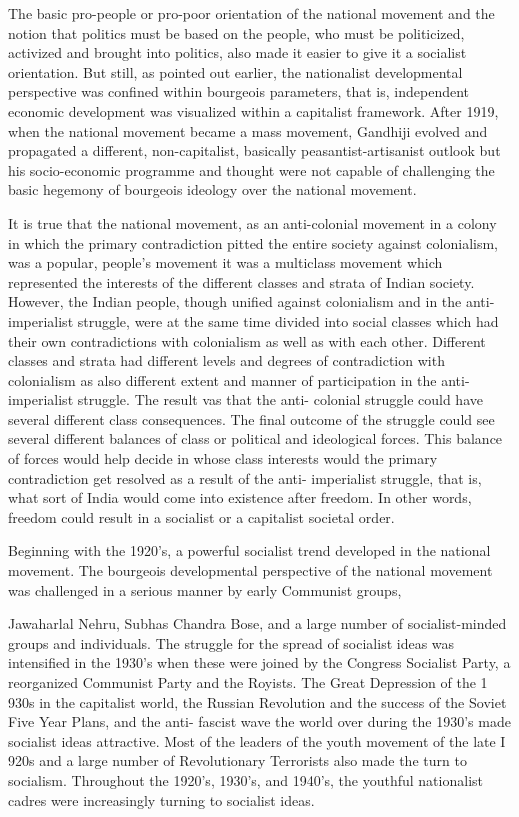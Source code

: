 \begin{multicols}{2}
The basic pro-people or pro-poor orientation of the national movement and the notion that politics must be based on the people, who must be politicized, activized and brought into politics, also made it easier to give it a socialist orientation. But still, as pointed out earlier, the nationalist developmental perspective was confined within bourgeois parameters, that is, independent economic development was visualized within a capitalist framework. After 1919, when the national movement became a mass movement, Gandhiji evolved and propagated a different, non-capitalist, basically peasantist-artisanist outlook but his socio-economic programme and thought were not capable of challenging the basic hegemony of bourgeois ideology over the national movement.

It is true that the national movement, as an anti-colonial movement in a colony in which the primary contradiction pitted the entire society against colonialism, was a popular, people's movement it was a multiclass movement which represented the interests of the different classes and strata of Indian society. However, the Indian people, though unified against colonialism and in the anti-imperialist struggle, were at the same time divided into social classes which had their own contradictions with colonialism as well as with each other. Different classes and strata had different levels and degrees of contradiction with colonialism as also different extent and manner of participation in the anti-imperialist struggle. The result vas that the anti- colonial struggle could have several different class consequences. The final outcome of the struggle could see several different balances of class or political and ideological forces. This balance of forces would help decide in whose class interests would the primary contradiction get resolved as a result of the anti- imperialist struggle, that is, what sort of India would come into existence after freedom. In other words, freedom could result in a socialist or a capitalist societal order.

Beginning with the 1920's, a powerful socialist trend developed in the national movement. The bourgeois developmental perspective of the national movement was challenged in a serious manner by early Communist groups,

Jawaharlal Nehru, Subhas Chandra Bose, and a large number of socialist-minded groups and individuals. The struggle for the spread of socialist ideas was intensified in the 1930's when these were joined by the Congress Socialist Party, a reorganized Communist Party and the Royists. The Great Depression of the 1 930s in the capitalist world, the Russian Revolution and the success of the Soviet Five Year Plans, and the anti- fascist wave the world over during the 1930's made socialist ideas attractive. Most of the leaders of the youth movement of the late I 920s and a large number of Revolutionary Terrorists also made the turn to socialism. Throughout the 1920's, 1930's, and 1940's, the youthful nationalist cadres were increasingly turning to socialist ideas.


\end{multicols}
